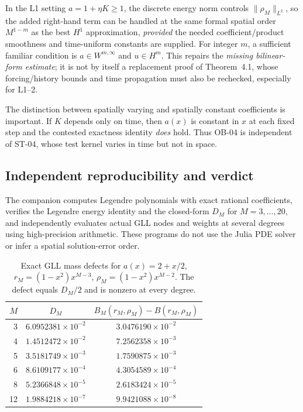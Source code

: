 \documentclass[11pt,a4paper]{amsart}
\theoremstyle{remark}
\theoremstyle{plain}
\theoremstyle{remark}
\numberwithin{equation}{section}
\begin{document}
In the L1 setting $a=1+\eta K\ge1$, the discrete energy norm controls $\|\rho_M\|_{L^2}$, so the added right-hand term can be handled at the same formal spatial order $M^{1-m}$ as the best $H^1$ approximation, \emph{provided} the needed coefficient/product smoothness and time-uniform constants are supplied. For integer $m$, a sufficient familiar condition is $a\in W^{m,\infty}$ and $u\in H^m$. This repairs the \emph{missing bilinear-form estimate}; it is not by itself a replacement proof of Theorem~4.1, whose forcing/history bounds and time propagation must also be rechecked, especially for L1--2.

The distinction between spatially varying and spatially constant coefficients is important. If $K$ depends only on time, then $a(x)$ is constant in $x$ at each fixed step and the contested exactness identity \emph{does} hold. Thus OB-04 is independent of ST-04, whose test kernel varies in time but not in space.

\subsection{Independent reproducibility and verdict}
The companion  computes Legendre polynomials with exact rational coefficients, verifies the Legendre energy identity and the closed-form $D_M$ for $M=3,\ldots,20$, and independently evaluates actual GLL nodes and weights at several degrees using high-precision arithmetic. These programs do not use the Julia PDE solver or infer a spatial solution-error order.
\begin{table}[ht]
\centering
\caption{Exact GLL mass defects for $a(x)=2+x/2$, $r_M=(1-x^2)x^{M-3}$, $\rho_M=(1-x^2)x^{M-2}$. The defect equals $D_M/2$ and is nonzero at every degree.}
\label{tab:ob04-degree}
\small
\begin{tabular}{@{}rcc@{}}\hline
$M$ & $D_M$ & $B_M(r_M,\rho_M)-B(r_M,\rho_M)$ \\\hline
3 & $6.0952381\times10^{-2}$ & $3.0476190\times10^{-2}$\\
4 & $1.4512472\times10^{-2}$ & $7.2562358\times10^{-3}$\\
5 & $3.5181749\times10^{-3}$ & $1.7590875\times10^{-3}$\\
6 & $8.6109177\times10^{-4}$ & $4.3054589\times10^{-4}$\\
8 & $5.2366848\times10^{-5}$ & $2.6183424\times10^{-5}$\\
12& $1.9884218\times10^{-7}$ & $9.9421088\times10^{-8}$\\\hline
\end{tabular}
\end{table}
\end{document}
